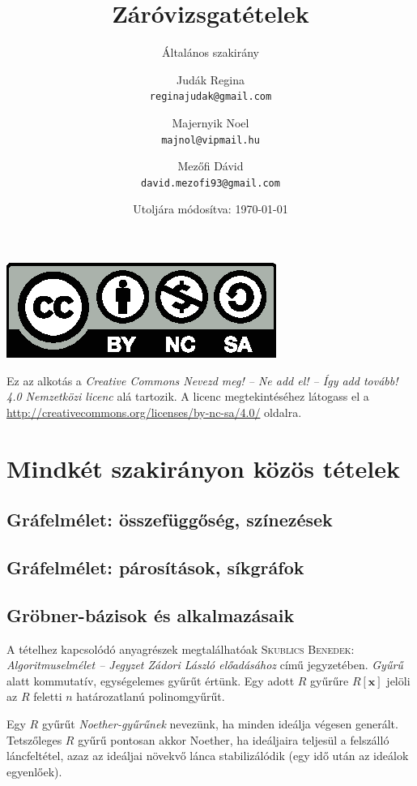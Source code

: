\documentclass[DIV=15,appendixprefix]{scrreprt}
\title{Záróvizsgatételek}
\subtitle{Általános szakirány}
\author{Judák Regina\\\texttt{reginajudak@gmail.com}%
	\and%
	Majernyik Noel\\\texttt{majnol@vipmail.hu}
	\and%
	Mezőfi Dávid\\\texttt{david.mezofi93@gmail.com}}
\date{Utoljára módosítva: \today}
\theoremstyle{definition}
\theoremstyle{remark}
\begin{document}
%
\maketitle
%
\begin{center}
	\includegraphics{by-nc-sa.eps}
\end{center}
Ez az alkotás a \emph{Creative Commons Nevezd meg! -- Ne add el! -- Így add tovább! 4.0 Nemzetközi
licenc} alá tartozik. A licenc megtekintéséhez látogass el a
\url{http://creativecommons.org/licenses/by-nc-sa/4.0/} oldalra.
%
\tableofcontents
%
%
%
\chapter{Mindkét szakirányon közös tételek}
%
\section{Gráfelmélet: összefüggőség, színezések}
%
\section{Gráfelmélet: párosítások, síkgráfok}
%
\section{Gröbner-bázisok és alkalmazásaik}
A tételhez kapcsolódó anyagrészek megtalálhatóak \textsc{Skublics Benedek}: \emph{Algoritmuselmélet -- Jegyzet Zádori László előadásához} \cite{Zadori} című jegyzetében.
%
\emph{Gyűrű} alatt kommutatív, egységelemes gyűrűt értünk. Egy adott $ R $ gyűrűre $ R \left[
\mathbf{ x } \right] $ jelöli az $ R $ feletti $ n $ határozatlanú polinomgyűrűt.

Egy $ R $ gyűrűt
\emph{Noether-gyűrűnek} nevezünk, ha minden ideálja végesen generált. Tetszőleges $ R $ gyűrű
pontosan akkor Noether, ha ideáljaira teljesül a felszálló láncfeltétel, azaz az ideáljai növekvő
lánca stabilizálódik (egy idő után az ideálok egyenlőek).
\end{document}
